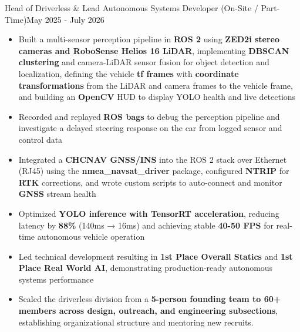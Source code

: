 \documentclass[a4paper,20pt]{article}
\makeatletter
\newcommand{\resumeItemWithoutTitle}[1] {
	\item\small{
		{#1 \vspace{-2pt}}
	}
}
\newcommand{\resumeSubheading}[4] {
	\vspace{-1pt}\item
	\begin{tabular*}{0.97\textwidth}{l@{\extracolsep{\fill}}r}
		\textbf{#1} & #2 \\
		\textit{#3} & \textit{#4} \\
	\end{tabular*}\vspace{-5pt}
}
\newcommand{\resumeItemListStart}{\begin{itemize}}
\newcommand{\resumeItemListEnd}{\end{itemize}\vspace{-5pt}}
\makeatother
\begin{document}
{Head of Driverless \& Lead Autonomous Systems Developer (On-Site / Part-Time)}{May 2025 - July 2026}
        \resumeItemListStart
        \resumeItemWithoutTitle{Built a multi-sensor perception pipeline in \textbf{ROS 2} using \textbf{ZED2i stereo cameras and RoboSense Helios 16 LiDAR}, implementing \textbf{DBSCAN clustering} and camera-LiDAR sensor fusion for object detection and localization, defining the vehicle \textbf{tf frames} with \textbf{coordinate transformations} from the LiDAR and camera frames to the vehicle frame, and building an \textbf{OpenCV} HUD to display YOLO health and live detections}
        \resumeItemWithoutTitle{Recorded and replayed \textbf{ROS bags} to debug the perception pipeline and investigate a delayed steering response on the car from logged sensor and control data}
        \resumeItemWithoutTitle{Integrated a \textbf{CHCNAV GNSS/INS} into the ROS 2 stack over Ethernet (RJ45) using the \textbf{nmea\_navsat\_driver} package, configured \textbf{NTRIP} for \textbf{RTK} corrections, and wrote custom scripts to auto-connect and monitor \textbf{GNSS} stream health}
        \resumeItemWithoutTitle{Optimized \textbf{YOLO inference with TensorRT acceleration}, reducing latency by \textbf{88\%} (140ms → 16ms) and achieving stable \textbf{40-50 FPS} for real-time autonomous vehicle operation}
        \resumeItemWithoutTitle{Led technical development resulting in \textbf{1st Place Overall Statics} and \textbf{1st Place Real World AI}, demonstrating production-ready autonomous systems performance}
        \resumeItemWithoutTitle{Scaled the driverless division from a \textbf{5-person founding team to 60+ members across design, outreach, and engineering subsections}, establishing organizational structure and mentoring new recruits.}
        \resumeItemListEnd
\end{document}
